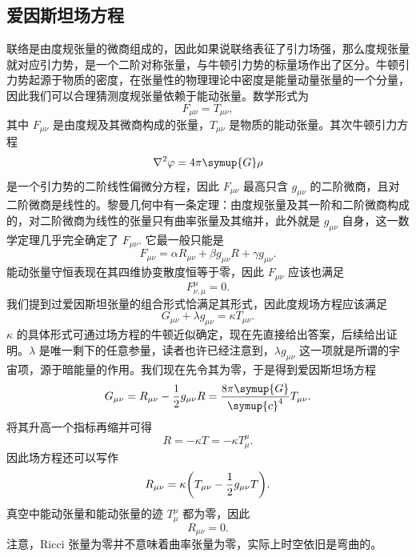 \documentclass[UTF8, 12pt, a4paper, oneside, onecolumn, fontset=none]{ctexart}
\begin{document}
\subsection{爱因斯坦场方程}
联络是由度规张量的微商组成的，因此如果说联络表征了引力场强，那么度规张量就对应引力势，是一个二阶对称张量，与牛顿引力势的标量场作出了区分。牛顿引力势起源于物质的密度，在张量性的物理理论中密度是能量动量张量的一个分量，因此我们可以合理猜测度规张量依赖于能动张量。数学形式为
\begin{equation}
F_{\mu\nu}=T_{\mu\nu},
\end{equation}
其中 $F_{\mu\nu}$ 是由度规及其微商构成的张量，$T_{\mu\nu}$ 是物质的能动张量。其次牛顿引力方程
\begin{equation}
\nabla^{2}\varphi=4\pi\symup{G}\rho
\end{equation}
是一个引力势的二阶线性偏微分方程，因此 $F_{\mu\nu}$ 最高只含 $g_{\mu\nu}$ 的二阶微商，且对二阶微商是线性的。黎曼几何中有一条定理：由度规张量及其一阶和二阶微商构成的，对二阶微商为线性的张量只有曲率张量及其缩并，此外就是 $g_{\mu\nu}$ 自身，这一数学定理几乎完全确定了 $F_{\mu\nu}$. 它最一般只能是
\begin{equation}
F_{\mu\nu}=\alpha R_{\mu\nu}+\beta g_{\mu\nu}R+\gamma g_{\mu\nu}.
\end{equation}
能动张量守恒表现在其四维协变散度恒等于零，因此 $F_{\mu\nu}$ 应该也满足
\begin{equation}
F^{\mu}_{\nu,\mu}=0.
\end{equation}
我们提到过爱因斯坦张量的组合形式恰满足其形式，因此度规场方程应该满足
\begin{equation}
G_{\mu\nu}+\lambda g_{\mu\nu}=\kappa T_{\mu\nu}.
\end{equation}
$\kappa$ 的具体形式可通过场方程的牛顿近似确定，现在先直接给出答案，后续给出证明。$\lambda$ 是唯一剩下的任意参量，读者也许已经注意到，$\lambda g_{\mu\nu}$ 这一项就是所谓的宇宙项，源于暗能量的作用。我们现在先令其为零，于是得到爱因斯坦场方程
\begin{equation}
G_{\mu\nu}=R_{\mu\nu}-\frac{1}{2}g_{\mu\nu}R=\frac{8\pi\symup{G}}{\symup{c}^{4}}T_{\mu\nu}.
\end{equation}
将其升高一个指标再缩并可得
\begin{equation}
R=-\kappa T=-\kappa T^{\mu}_{\mu}.
\end{equation}
因此场方程还可以写作
\begin{equation}
R_{\mu\nu}=\kappa\mleft(T_{\mu\nu}-\frac{1}{2}g_{\mu\nu}T\mright).
\end{equation}
真空中能动张量和能动张量的迹 $T^{\mu}_{\mu}$ 都为零，因此
\begin{equation}
R_{\mu\nu}=0.
\end{equation}
注意，Ricci 张量为零并不意味着曲率张量为零，实际上时空依旧是弯曲的。
\end{document}
